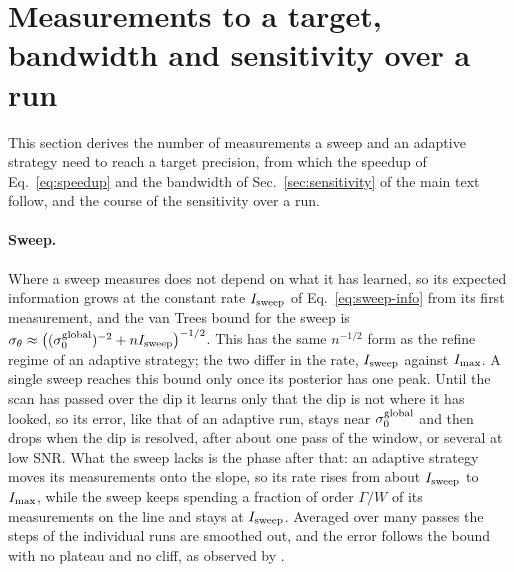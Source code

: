 \section{Measurements to a target, bandwidth and sensitivity over a run}
\label{sm:speedup}

This section derives the number of measurements a sweep and an adaptive strategy need to reach a target
precision, from which the speedup of Eq.~\eqref{eq:speedup} and the bandwidth of Sec.~\ref{sec:sensitivity} of
the main text follow, and the course of the sensitivity over a run.

\paragraph{Sweep.} Where a sweep measures does not depend on what it has learned, so its expected information grows
at the constant rate $I_{\rm sweep}$ of Eq.~\eqref{eq:sweep-info} from its first measurement, and the van Trees bound
for the sweep is $\sigma_\theta\approx\big((\sigma_0^{\rm global})^{-2}+nI_{\rm sweep}\big)^{-1/2}$. This has the same $n^{-1/2}$ form as the refine
regime of an adaptive strategy; the two differ in the rate, $I_{\rm sweep}$ against $I_{\rm max}$. A single sweep
reaches this bound only once its posterior has one peak. Until the scan has passed over the dip it learns only that
the dip is not where it has looked, so its error, like that of an adaptive run, stays near $\sigma_0^{\rm global}$ and then drops
when the dip is resolved, after about one pass of the window, or several at low SNR. What the sweep lacks is the
phase after that: an adaptive strategy moves its measurements onto the slope, so its rate rises from about
$I_{\rm sweep}$ to $I_{\rm max}$, while the sweep keeps spending a fraction of order $\Gamma/W$ of its measurements on
the line and stays at $I_{\rm sweep}$. Averaged over many passes the steps of the individual runs are smoothed out,
and the error follows the bound with no plateau and no cliff, as observed by \citet{dushenko2020sbed}.

